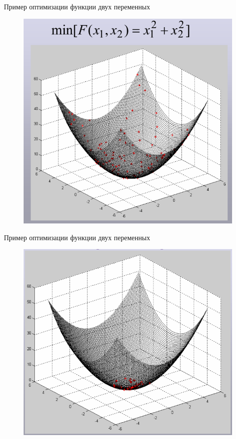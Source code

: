 \documentclass{beamer}
\begin{document}
\begin{frame}{Пример оптимизации функции двух переменных}
\begin{figure}[h]
\centering
\includegraphics[scale=0.4]{images/lec04-pic18.png}
\end{figure}
\end{frame}

\begin{frame}{Пример оптимизации функции двух переменных}
\begin{figure}[h]
\centering
\includegraphics[scale=0.4]{images/lec04-pic19.png}
\end{figure}
\end{frame}
\end{document}
